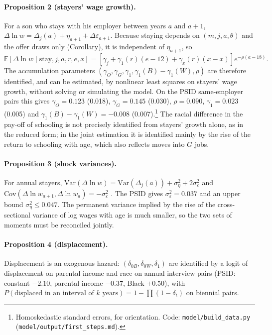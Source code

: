 \documentclass[11pt]{article}
\newcommand{\code}[1]{\texttt{#1}}
\newcommand{\E}{\mathbb{E}}
\newcommand{\1}{\mathbf{1}}
\begin{document}
\paragraph{Proposition 2 (stayers' wage growth).} For a son who stays with his employer between years $a$ and $a+1$,
$\Delta \ln w = \Delta_j(a) + \eta_{a+1} + \Delta\varepsilon_{a+1}$. Because staying depends on $(m, j, a, \theta)$ and
the offer draws only (Corollary), it is independent of $\eta_{a+1}$, so
\begin{equation}\label{eq:stayers}
\E[\Delta \ln w \mid \text{stay}, j, a, r, e, x] = \left[\gamma_j + \gamma_1(r)(e - 12) + \gamma_x(r)(x - \bar x)
\right] e^{-\rho(a - 18)} .
\end{equation}
The accumulation parameters $(\gamma_O, \gamma_G, \gamma_1, \gamma_1(B) - \gamma_1(W), \rho)$ are therefore identified,
and can be estimated, by nonlinear least squares on stayers' wage growth, without solving or simulating the model. On
the PSID same-employer pairs this gives $\gamma_O = 0.123$ (0.018), $\gamma_G = 0.145$ (0.030), $\rho = 0.090$, $\gamma_1 =
0.023$ (0.005) and $\gamma_1(B) - \gamma_1(W) = -0.008$ (0.007).\footnote{Homoskedastic standard errors, for orientation.
Code: \code{model/build\_data.py} (\code{model/output/first\_steps.md}).} The racial difference in the pay-off of
schooling is not precisely identified from stayers' growth alone, as in the reduced form; in the joint estimation it is
identified mainly by the rise of the return to schooling with age, which also reflects moves into $G$ jobs.

\paragraph{Proposition 3 (shock variances).} For annual stayers, $\mathrm{Var}(\Delta \ln w) = \mathrm{Var}(\Delta_j(a)) +
\sigma_\eta^2 + 2\sigma_\varepsilon^2$ and $\mathrm{Cov}(\Delta \ln w_{a+1}, \Delta \ln w_a) = -\sigma_\varepsilon^2$
\citep[the covariance structure of][]{altonji2013modeling}. The PSID gives $\sigma_\varepsilon^2 = 0.037$ and an upper bound
$\sigma_\eta^2 \le 0.047$. The permanent variance implied by the rise of the cross-sectional variance of log wages with
age is much smaller, so the two sets of moments must be reconciled jointly.

\paragraph{Proposition 4 (displacement).} Displacement is an exogenous hazard: $(\delta_{0B}, \delta_{0W}, \delta_1)$ are
identified by a logit of displacement on parental income and race on annual interview pairs (PSID: constant $-2.10$,
parental income $-0.37$, Black $+0.50$), with $P(\text{displaced in an interval of } k \text{ years}) = 1 - \prod (1 -
\delta_t)$ on biennial pairs.
\end{document}
